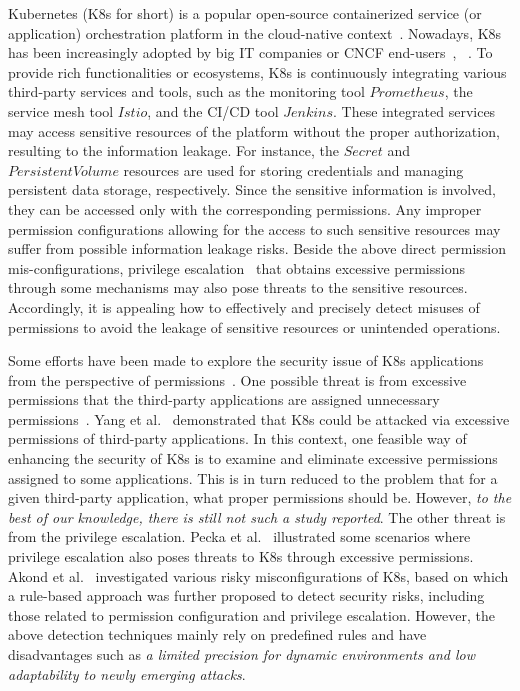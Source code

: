 \documentclass[conference]{IEEEtran}
\theoremstyle{definition}
\begin{document}
Kubernetes (K8s for short) is a popular open-source containerized service (or application) orchestration platform in the cloud-native context~\cite{kubernetes2024}. Nowadays, K8s has been increasingly adopted by big IT companies or CNCF end-users~\cite{alibaba2024}, ~\cite{cncf2022survey}. To provide rich functionalities or ecosystems, K8s is continuously integrating various third-party services and tools, such as the monitoring tool $Prometheus$, the service mesh tool $Istio$, and the CI/CD tool $Jenkins$. These integrated services may access sensitive resources of the platform without the proper authorization, resulting to the information leakage. For instance, the $Secret$ and $PersistentVolume$ resources are used for storing credentials and managing persistent data storage, respectively. Since the sensitive information is involved, they can be accessed only with the corresponding permissions. Any improper permission configurations allowing for the access to such sensitive resources may suffer from possible information leakage risks. Beside the above direct permission mis-configurations, privilege escalation~\cite{yang2023take} that obtains excessive permissions through some mechanisms may also pose threats to the sensitive resources. Accordingly, it is appealing how to effectively and precisely detect misuses of permissions to avoid the leakage of sensitive resources or unintended operations.

Some efforts have been made to explore the security issue of K8s applications from the perspective of permissions~\cite{yang2023take, k8smanifests2023,pecka2022privilege}. 
One possible threat is from excessive permissions that the third-party applications are assigned unnecessary permissions~\cite{o1995redundant}. Yang et al.~\cite{yang2023take} demonstrated that K8s could be attacked via excessive permissions of third-party applications. In this context, one feasible way of  enhancing the security of K8s is to examine and eliminate excessive permissions assigned to some applications. This is in turn reduced to the problem that for a given third-party application, what proper permissions should be. However, \textit{to the best of our knowledge, there is still not such a study reported}. The other threat is from the privilege escalation. Pecka et al.~\cite{pecka2022privilege} illustrated some scenarios where privilege escalation also poses threats to K8s through excessive permissions. Akond et al.~\cite{k8smanifests2023} investigated various risky misconfigurations of K8s, based on which a rule-based approach was further proposed to detect security risks, including those related to permission configuration and privilege escalation. However, the above detection techniques mainly rely on predefined rules and have disadvantages such as \textit{a limited precision for dynamic environments and low adaptability to newly emerging attacks}.
\end{document}
